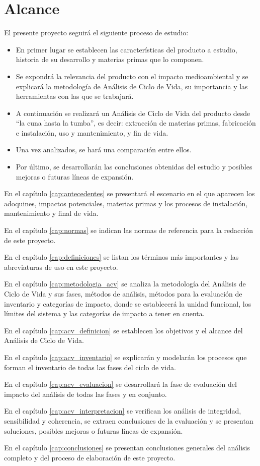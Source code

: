 \chapter{Alcance}\label{cap:alcance}

El presente proyecto seguirá el siguiente proceso de estudio:

\begin{itemize}
  \item En primer lugar se establecen las características del producto a estudio, historia de su desarrollo y materias primas que lo componen.
  \item Se expondrá la relevancia del producto con el impacto medioambiental y se explicará la metodología de Análisis de Ciclo de Vida, su importancia y las herramientas con las que se trabajará.
  \item A continuación se realizará un Análisis de Ciclo de Vida del producto desde ``la cuna hasta la tumba'', es decir: extracción de materias primas, fabricación e instalación, uso y mantenimiento, y fin de vida.
  \item Una vez analizados, se hará una comparación entre ellos.
  \item Por último, se desarrollarán las conclusiones obtenidas del estudio y posibles mejoras o futuras líneas de expansión.
\end{itemize}

En el capítulo \ref{cap:antecedentes} se presentará el escenario en el que aparecen los adoquines, impactos potenciales, materias primas y los procesos de instalación, mantenimiento y final de vida.

En el capítulo \ref{cap:normas} se indican las normas de referencia para la redacción de este proyecto.

En el capítulo \ref{cap:definiciones} se listan los términos más importantes y las abreviaturas de uso en este proyecto.

En el capítulo \ref{cap:metodologia_acv} se analiza la metodología del Análisis de Ciclo de Vida y sus fases, métodos de análisis, métodos para la evaluación de inventario y categorías de impacto, donde se establecerá la unidad funcional, los límites del sistema y las categorías de impacto a tener en cuenta.

En el capítulo \ref{cap:acv_definicion} se establecen los objetivos y el alcance del Análisis de Ciclo de Vida.

En el capítulo \ref{cap:acv_inventario} se explicarán y modelarán los procesos que forman el inventario de todas las fases del ciclo de vida.

En el capítulo \ref{cap:acv_evaluacion} se desarrollará la fase de evaluación del impacto del análisis de todas las fases y en conjunto.

En el capítulo \ref{cap:acv_interpretacion} se verifican los análisis de integridad, sensibilidad y coherencia, se extraen conclusiones de la evaluación y se presentan soluciones, posibles mejoras o futuras líneas de expansión.

En el capítulo \ref{cap:conclusiones} se presentan conclusiones generales del análisis completo y del proceso de elaboración de este proyecto.

